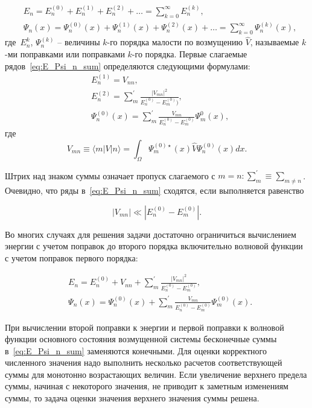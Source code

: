\begin{equation}
\label{eq:E_Psi_n_sum}
\begin{split}
    &E_n=E_n^{(0)} + E_n^{(1)} + E_n^{(2)} +\dots =\sum_{k=0}^{\infty}E_n^{(k)},\\
    &\Psi_n(x)=\Psi_n^{(0)}(x) + \Psi_n^{(1)}(x) + \Psi_n^{(2)}(x) +\dots =\sum_{k=0}^{\infty}\Psi_n^{(k)}(x),
\end{split}
\end{equation}
где~$E_n^{k}$, $\Psi_n^{(k)}$ -- величины $k$-го порядка малости по возмущению $\hat{V}$, называемые $k$-ми поправками или поправками $k$-го порядка.
Первые слагаемые рядов~\eqref{eq:E_Psi_n_sum} определяются следующими формулами:
\begin{equation}
\begin{split}
    \label{eq:EPsi_nk_first}
    &E_n^{(1)}=V_{nn}, \\
    &E_n^{(2)}=\sum_m^{\prime}{\frac{|V_{mn}|^2}{E_n^{(0)}-E_m^{(0)})}}, \\
    &\Psi_n^{(0)}(x)=\sum_m^{\prime}{\frac{V_{mn}}{E_n^{(0)}-E_m^{(0)}}}\Psi_m^{0}(x),
\end{split}
\end{equation}
где
\begin{equation}
    \label{eq:v_mn}
    V_{mn}\equiv \langle{m|V|n}\rangle=\int_{\Omega}{\Psi_m^{(0)\star}(x)\hat{V}\Psi_n^{(0)}(x)dx.}
\end{equation}


Штрих над знаком суммы означает пропуск слагаемого с $m=n: \sum_m^{\prime}\equiv \sum_{m\neq n}$.
Очевидно, что ряды в~\eqref{eq:E_Psi_n_sum} сходятся, если выполняется равенство

\begin{equation}
    \label{eq:eq_for_conj}
    |V_{mn}|\ll|E_n^{(0)}-E_m^{(0)}|.
\end{equation}


Во многих случаях для решения задачи достаточно ограничиться вычислением энергии с учетом поправок до второго порядка включительно волновой функции с учетом поправок первого порядка\cite{tim_pertrubations}:

\begin{equation}
\label{eq:first_order_e_psi}
\begin{split}
    &E_n = E_n^{(0)}+V_{nn}+\sum_m^{\prime}{\frac{|V_{mn}|^2}{E_n^{(0)}-E_m^{(0)}}}, \\
    &\Psi_n(x)=\Psi_n^{(0)}(x)+\sum_m^{\prime}{\frac{V_{mn}}{E_n^{(0)}-E_m^{(0)}}\Psi_m^{(0)}(x)}.
\end{split}
\end{equation}


При вычислении второй поправки к энергии и первой поправки к волновой функции основного состояния возмущенной системы бесконечные суммы в~\eqref{eq:E_Psi_n_sum} заменяются конечными.
Для оценки корректного численного значения надо выполнить несколько расчетов соответствующей суммы для монотонно возрастающих величин.
Если увеличение верхнего предела суммы, начиная с некоторого значения, не приводит к заметным изменениям суммы, то задача оценки значения верхнего значения суммы решена.